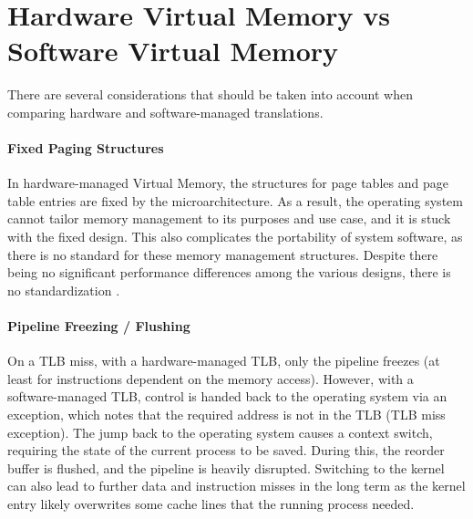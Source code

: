 







\section{Hardware Virtual Memory vs Software Virtual Memory}

There are several considerations that should be taken into account when comparing hardware and
software-managed translations.

\paragraph{Fixed Paging Structures} In hardware-managed Virtual Memory, the structures for page tables
and page table entries are fixed by the microarchitecture. As a result, the operating system cannot tailor
memory management to its purposes and use case, and it is stuck with the fixed design.
This also complicates the portability of system software, as there is no standard for these memory management
structures. Despite there being no significant performance differences among the various designs,
there is no standardization \cite{jacob1998look}.

\paragraph{Pipeline Freezing / Flushing} On a TLB miss,
with a hardware-managed TLB, only the pipeline freezes (at least for instructions dependent on
the memory access). However, with a software-managed TLB, control is handed back to the operating system
via an exception, which notes that the required address is not in the TLB (TLB miss exception).
The jump back to the operating system causes a context switch, requiring the state of the current process
to be saved. During this, the reorder buffer is flushed, and the pipeline is heavily disrupted.
Switching to the kernel can also lead to further data and instruction misses in the long term
as the kernel entry likely overwrites some cache lines that the running process needed. 

